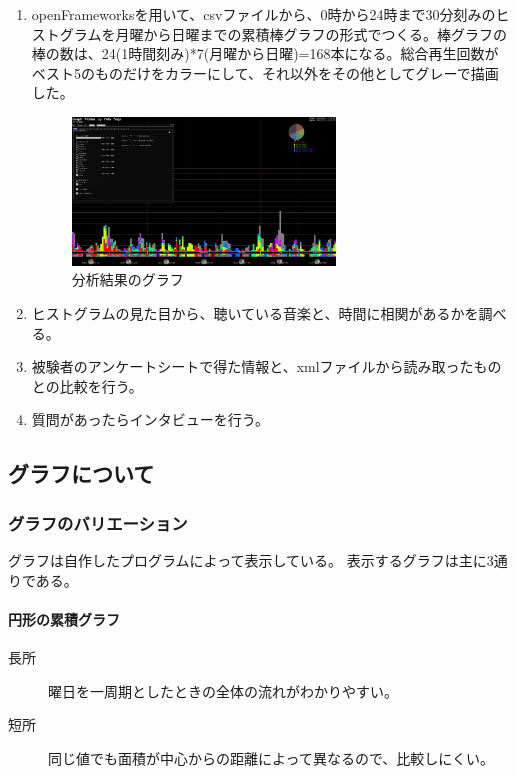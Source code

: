 \documentclass[11pt, twocolumn]{jsarticle}
\begin{document}
\begin{enumerate}
\item
openFrameworksを用いて、csvファイルから、0時から24時まで30分刻みのヒストグラムを月曜から日曜までの累積棒グラフの形式でつくる。棒グラフの棒の数は、24(1時間刻み)*7(月曜から日曜)=168本になる。総合再生回数がベスト5のものだけをカラーにして、それ以外をその他としてグレーで描画した。

\begin{figure}
\begin{center}
\includegraphics[width=7cm]{graph_sample.png}
\caption{分析結果のグラフ}
\end{center}
\end{figure}

\item
ヒストグラムの見た目から、聴いている音楽と、時間に相関があるかを調べる。
\item
被験者のアンケートシートで得た情報と、xmlファイルから読み取ったものとの比較を行う。
\item
質問があったらインタビューを行う。

\end{enumerate}
\subsection{グラフについて}
\subsubsection{グラフのバリエーション}
グラフは自作したプログラムによって表示している。
表示するグラフは主に3通りである。

\paragraph{円形の累積グラフ}

\begin{description}
\item[長所]
曜日を一周期としたときの全体の流れがわかりやすい。
\item[短所]
同じ値でも面積が中心からの距離によって異なるので、比較しにくい。
\end{description}
\end{document}
